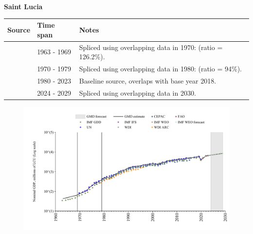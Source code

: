 \documentclass[12pt,a4paper,landscape]{article}
\begin{document}
\begin{adjustbox}{max totalsize={\paperwidth}{\paperheight},center}
\begin{minipage}[t][\textheight][t]{\textwidth}
\vspace*{0.5cm}
{}
\begin{center}
{\Large\bfseries Saint Lucia}
\end{center}
\vspace{0.5cm}
\begin{table}[H]
\centering
\small
\begin{tabular}{|l|l|l|}
\hline
\textbf{Source} & \textbf{Time span} & \textbf{Notes} \\
\hline
\rowcolor{white}\cite{IMF_GDD}& 1963 - 1969 &Spliced using overlapping data in 1970: (ratio = 126.2\%).\\
\rowcolor{lightgray}\cite{UN}& 1970 - 1979 &Spliced using overlapping data in 1980: (ratio = 94\%).\\
\rowcolor{white}\cite{WDI}& 1980 - 2023 &Baseline source, overlaps with base year 2018.\\
\rowcolor{lightgray}\cite{IMF_WEO_forecast}& 2024 - 2029 &Spliced using overlapping data in 2030.\\
\hline
\end{tabular}
\end{table}
\begin{figure}[H]
\centering
\includegraphics[width=\textwidth,height=0.6\textheight,keepaspectratio]{graphs/LCA_nGDP.pdf}
\end{figure}
\end{minipage}
\end{adjustbox}
\end{document}
